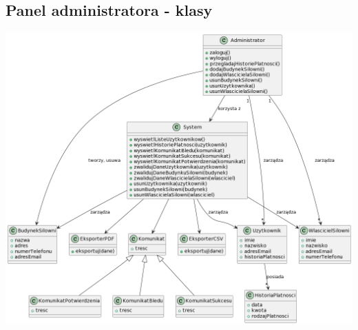 \subsection{Panel administratora - klasy}\label{subsec:administrator}

\includegraphics{diagrams/class/panel_admina.png}
